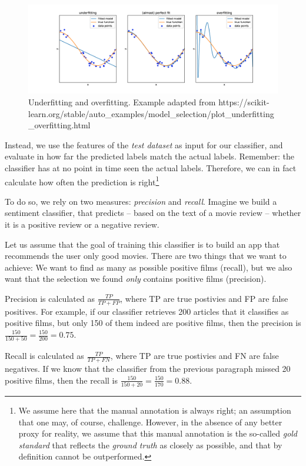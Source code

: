 \begin{figure} 
\centering
\includegraphics[width=\linewidth]{figures/ch09_overfitting}
\caption{Underfitting and overfitting. Example adapted from https://scikit-learn.org/stable/auto\_examples/model\_selection/plot\_underfitting\_overfitting.html}
\label{fig:roccurve}
\end{figure}


Instead, we use the features of the \emph{test dataset} as input for our classifier,
and evaluate in how far the predicted labels match the actual labels.
Remember: the classifier has at no point in time seen the actual labels.
Therefore, we can in fact calculate how often the prediction is right\footnote{We
  assume here that the manual annotation is always right; an assumption that one
  may, of course, challenge. However, in the absence of any better proxy for
  reality, we assume that this manual annotation is the so-called \emph{gold standard}
  that reflects the \emph{ground truth} as closely as possible, and that by
  definition cannot be outperformed.}


To do so, we rely on two measures: \emph{precision} and \emph{recall}.
Imagine we build a sentiment classifier, that predicts -- based on the text of a movie review -- whether it is a positive review or a negative review. 

Let us assume that the goal of training this classifier is to build an app that recommends the user only good movies. There are two things that we want to achieve: We want to find as many as possible positive films (recall), but we also want that the selection we found \emph{only} contains positive films (precision).

Precision is calculated as $\frac{TP}{TP+FP}$, where TP are true postivies and FP are false positives. For example, if our classifier retrieves 200 articles that it classifies as positive films, but only 150 of them indeed are positive films, then the precision is $\frac{150}{150+50} = \frac{150}{200} = 0.75$.

Recall is calculated as $\frac{TP}{TP+FN}$, where TP are true postivies and FN are false negatives. If we know that the classifier from the previous paragraph missed 20 positive films, then the recall is $\frac{150}{150+20} = \frac{150}{170}= 0.88$.

